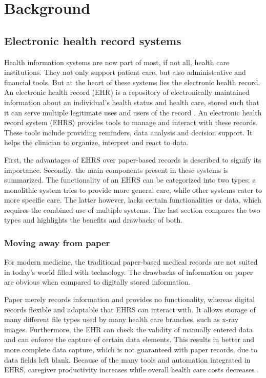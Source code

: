 \section{Background} \label{background}



    \subsection{Electronic health record systems}

    Health information systems are now part of most, if not all, health care institutions. They not only support patient care, but also administrative and financial tools. But at the heart of these systems lies the electronic health record. An electronic health record (EHR) is a repository of electronically maintained information about an individual's health status and health care, stored such that it can serve multiple legitimate uses and users of the record \cite{biomedical_informatics}. An electronic health record system (EHRS) provides tools to manage and interact with these records. These tools include providing reminders, data analysis and decision support. It helps the clinician to organize, interpret and react to data.

    First, the advantages of EHRS over paper-based records is described to signify its importance. Secondly, the main components present in these systems is summarized. The functionality of an EHRS can be categorized into two types: a monolithic system tries to provide more general care, while other systems cater to more specific care. The latter however, lacks certain functionalities or data, which requires the combined use of multiple systems. The last section compares the two types and highlights the benefits and drawbacks of both.

        \subsubsection{Moving away from paper} \label{2_ehrs_paper}

        For modern medicine, the traditional paper-based medical records are not suited in today's world filled with technology. The drawbacks of information on paper are obvious when compared to digitally stored information.

        Paper merely records information and provides no functionality, whereas digital records flexible and adaptable that EHRS can interact with. It allows storage of many different file types used by many health care branches, such as x-ray images. Furthermore, the EHR can check the validity of manually entered data and can enforce the capture of certain data elements. This results in better and more complete data capture, which is not guaranteed with paper records, due to data fields left blank. Because of the many tools and automation integrated in EHRS, caregiver productivity increases \cite{ehrs_efficiency} while overall health care costs decreases .

